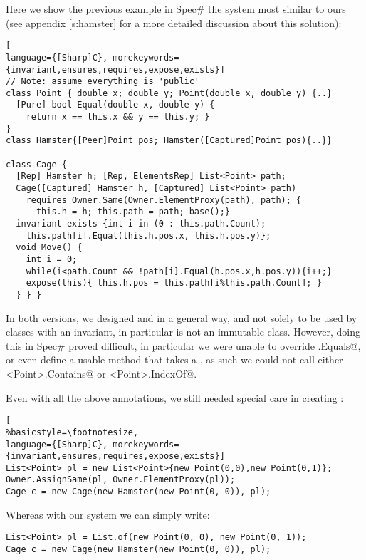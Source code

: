  Here we show the previous example in Spec\# the system most similar to ours (see appendix \ref{s:hamster} for a more detailed discussion about this solution):
\begin{lstlisting}[
language={[Sharp]C}, morekeywords={invariant,ensures,requires,expose,exists}]
// Note: assume everything is 'public'
class Point { double x; double y; Point(double x, double y) {..}
  [Pure] bool Equal(double x, double y) {
    return x == this.x && y == this.y; }
}
class Hamster{[Peer]Point pos; Hamster([Captured]Point pos){..}}

class Cage {
  [Rep] Hamster h; [Rep, ElementsRep] List<Point> path;
  Cage([Captured] Hamster h, [Captured] List<Point> path)
    requires Owner.Same(Owner.ElementProxy(path), path); {
      this.h = h; this.path = path; base();}
  invariant exists {int i in (0 : this.path.Count);
    this.path[i].Equal(this.h.pos.x, this.h.pos.y)};
  void Move() {
    int i = 0;
    while(i<path.Count && !path[i].Equal(h.pos.x,h.pos.y)){i++;}
    expose(this){ this.h.pos = this.path[i%this.path.Count]; }
  } } }
\end{lstlisting}
In both versions, we designed \Q@Point@ and \Q@Hamster@ in a general way, and not solely to be used by classes with an invariant, in particular \Q@Point@ is not an immutable class. However, doing this in Spec\# proved difficult, in particular we were unable to override \Q@Object.Equals@, or even define a usable \Q@equals@ method that takes a \Q@Point@, as such we could not call either \Q@List<Point>.Contains@ or \Q@List<Point>.IndexOf@.
 
\noindent Even with all the above annotations, we still needed special care in creating \Q@Cage@s:
\begin{lstlisting}[
%basicstyle=\footnotesize,
language={[Sharp]C}, morekeywords={invariant,ensures,requires,expose,exists}]
List<Point> pl = new List<Point>{new Point(0,0),new Point(0,1)};
Owner.AssignSame(pl, Owner.ElementProxy(pl));
Cage c = new Cage(new Hamster(new Point(0, 0)), pl);
\end{lstlisting}
Whereas with our system we can simply write:
\begin{lstlisting}
List<Point> pl = List.of(new Point(0, 0), new Point(0, 1));
Cage c = new Cage(new Hamster(new Point(0, 0)), pl);
\end{lstlisting}

